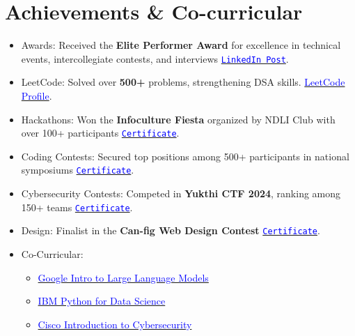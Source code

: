 \documentclass[letterpaper,10pt]{article}
\newcommand{\resumeItem}[1]{
  \item\small{
    {#1 \vspace{-2pt}} %
  }
}
\newcommand{\resumeSubHeadingListStart}{\begin{itemize}[leftmargin=0.15in, label={}]
  \setlength\itemsep{-1pt} %
}
\newcommand{\resumeSubHeadingListEnd}{\end{itemize}\vspace{-5pt}} %
\begin{document}
\section{Achievements \& Co-curricular}
 \resumeSubHeadingListStart
    \resumeItem{Awards: Received the \textbf{Elite Performer Award} for excellence in technical events, intercollegiate contests, and interviews \href{https://www.linkedin.com/posts/karthik-balaji-b-m_feeling-grateful-to-receive-the-elite-performer-activity-7313923056073068544-nBOW}{\textcolor{blue}{\texttt{LinkedIn Post}}}.}
    \resumeItem{LeetCode: Solved over \textbf{500+} problems, strengthening DSA skills. \href{https://leetcode.com/u/Karthik_Balaji_B_M/}{\textcolor{blue}{LeetCode Profile}}.}
    \resumeItem{Hackathons: Won the \textbf{Infoculture Fiesta} organized by NDLI Club with over 100+ participants \href{https://drive.google.com/file/d/1ZPVtIVBXEXQ9nZyLUgUh9fPpgyczOicy/view?usp=sharing}{\textcolor{blue}{\texttt{Certificate}}}.}
    \resumeItem{Coding Contests: Secured top positions among 500+ participants in national symposiums \href{https://drive.google.com/drive/folders/1WUgGes_XiSqPRHACztV4bxDUYZcpKePp?usp=sharing}{\textcolor{blue}{\texttt{Certificate}}}.}
    \resumeItem{Cybersecurity Contests: Competed in \textbf{Yukthi CTF 2024}, ranking among 150+ teams \href{https://drive.google.com/file/d/17W7xCYqn9pS5-ZXza5MmefWJbh4CEMXa/view?usp=sharing}{\textcolor{blue}{\texttt{Certificate}}}.}
    \resumeItem{Design: Finalist in the \textbf{Can-fig Web Design Contest} \href{https://drive.google.com/file/d/1f53wPW92s0DuqOJ3FL21Rsep1SONEtKZ/view?usp=sharing}{\textcolor{blue}{\texttt{Certificate}}}.}
    \resumeItem{Co-Curricular:}
        \begin{itemize}
            \resumeItem{\href{https://www.cloudskillsboost.google/public_profiles/158f35d6-a88b-422a-94fe-ecb604a2a08f/badges/4259476}{\textcolor{blue}{Google Intro to Large Language Models}}}
            \resumeItem{\href{https://drive.google.com/file/d/1SeYYt4ejd1_y9R5SRhuc2eaYl_aJCxcm/view?usp=sharing}{\textcolor{blue}{IBM Python for Data Science}}}
            \resumeItem{\href{https://drive.google.com/file/d/1F9WqX5ykQ-7mrIicxLhQsT36bq5n_GES/view?usp=sharing}{\textcolor{blue}{Cisco Introduction to Cybersecurity}}}
        \end{itemize}
 \resumeSubHeadingListEnd
 \vspace{-10pt}
\end{document}

